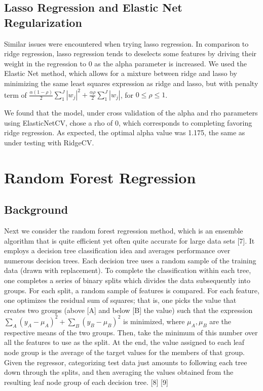 \documentclass{article}
\begin{document}
\subsection{Lasso Regression and Elastic Net Regularization}

Similar issues were encountered when trying lasso regression. In comparison to ridge regression, lasso regression tends to deselects some features by driving their weight in the regression to 0 as the alpha parameter is increased. We used the Elastic Net method, which allows for a mixture between ridge and lasso by minimizing the same least squares expression as ridge and lasso, but with penalty term of $\frac{\alpha (1-\rho )}{2} \sum_1^J |w_j|^2 + \frac{\alpha \rho }{2} \sum_1^J |w_j|$, for $0 \leq \rho \leq 1$.

We found that the model, under cross validation of the alpha and rho parameters using ElasticNetCV, chose a rho of 0, which corresponds to completing favoring ridge regression. As expected, the optimal alpha value was 1.175, the same as under testing with RidgeCV.

\section{Random Forest Regression}

\subsection{Background}

Next we consider the random forest regression method, which is an ensemble algorithm that is quite efficient yet often quite accurate for large data sets [7]. It employs a decision tree classification idea and averages performance over numerous decision trees. Each decision tree uses a random sample of the training data (drawn with replacement). To complete the classification within each tree, one completes a series of binary splits which divides the data subsequently into groups. For each split, a random sample of features is compared. For each feature, one optimizes the residual sum of squares; that is, one picks the value that creates two groups (above [A] and below [B] the value) such that the expression $\sum_A (y_A - \mu _A)^2 + \sum_B (y_B - \mu _B)^2$ is minimized, where $\mu _A, \mu _B$ are the respective means of the two groups. Then, take the minimum of this number over all the features to use as the split. At the end, the value assigned to each leaf node group is the average of the target values for the members of that group. Given the regressor, categorizing test data just amounts to following each tree down through the splits, and then averaging the values obtained from the resulting leaf node group of each decision tree. [8] [9]
\end{document}
